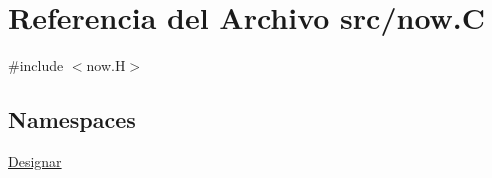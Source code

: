\hypertarget{now_8_c}{}\section{Referencia del Archivo src/now.C}
\label{now_8_c}
{\ttfamily \#include $<$now.\+H$>$}\newline
\subsection*{Namespaces}
\begin{DoxyCompactItemize}
\item 
 \hyperlink{namespace_designar}{Designar}
\end{DoxyCompactItemize}
